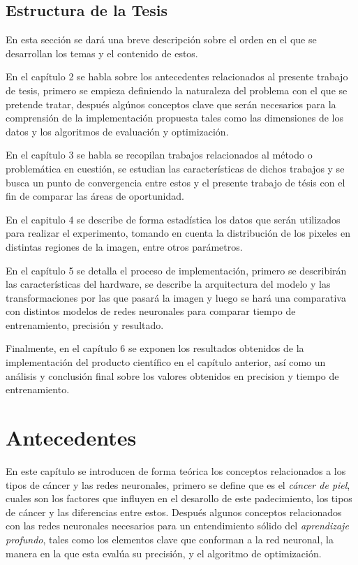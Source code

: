 \section{Estructura de la Tesis}
En esta sección se dará una breve descripción sobre el orden en el que se desarrollan los temas y el contenido de estos.

En el capítulo 2 se habla sobre los antecedentes relacionados al presente trabajo de tesis, primero se empieza definiendo la naturaleza del problema con el que se pretende tratar, después algúnos conceptos clave que serán necesarios para la comprensión de la implementación propuesta tales como las dimensiones de los datos y los algoritmos de evaluación y optimización. 

En el capítulo 3 se habla se recopilan trabajos relacionados al método o problemática en cuestión, se estudian las características de dichos trabajos y se busca un punto de convergencia entre estos y el presente trabajo de tésis con el fin de comparar las áreas de oportunidad.

En el capitulo 4 se describe de forma estadística los datos que serán utilizados para realizar el experimento, tomando en cuenta la distribución de los pixeles en distintas regiones de la imagen, entre otros parámetros. 

En el capítulo 5 se detalla el proceso de implementación, primero se describirán las características del hardware, se describe la arquitectura del modelo y las transformaciones por las que pasará la imagen y luego se hará una comparativa con distintos modelos de redes neuronales para comparar tiempo de entrenamiento, precisión y resultado.

Finalmente, en el capítulo 6 se exponen los resultados obtenidos de la implementación del producto científico en el capítulo anterior, así como un análisis y conclusión final sobre los valores obtenidos en precision y tiempo de entrenamiento. 

\chapter{Antecedentes}
En este capítulo se introducen de forma teórica los conceptos relacionados a los tipos de cáncer y las redes neuronales, primero se define que es el \emph{cáncer de piel}, cuales son los factores que influyen en el desarollo de este padecimiento, los tipos de cáncer y las diferencias entre estos. Después algunos conceptos relacionados con las redes neuronales necesarios para un entendimiento sólido del \emph{aprendizaje profundo}, tales como los elementos clave que conforman a la red neuronal, la manera en la que esta evalúa su precisión, y el algoritmo de optimización.

